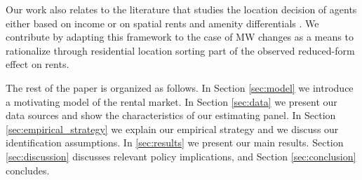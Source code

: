 Our work also relates to the literature that studies the location decision of agents 
either based on income \parencite{Roback1982, Kennan2011, DesmetRossihansberg2013, 
PerezPerez2018, Monras2019} or on spatial rents and amenity differentials 
\parencite{Diamond2016, AlmagroDominguez2019, Couture2019}.
We contribute by adapting this framework to the case of MW changes as a means to 
rationalize through residential location sorting part of the observed reduced-form effect 
on rents. 

The rest of the paper is organized as follows.
In Section \ref{sec:model} we introduce a motivating model of the rental market.
In Section \ref{sec:data} we present our data sources and show the characteristics 
of our estimating panel.
In Section \ref{sec:empirical_strategy} we explain our empirical strategy and
we discuss our identification assumptions.
In \ref{sec:results} we present our main results.
Section \ref{sec:discussion} discusses relevant policy implications, and
Section \ref{sec:conclusion} concludes.
